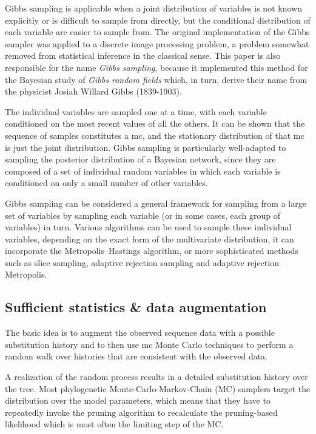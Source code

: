 Gibbs sampling is applicable when a joint distribution of variables is not known explicitly or is difficult to sample from directly, but the conditional distribution of each variable are easier to sample from.
The original implementation of the Gibbs sampler was applied to a discrete image processing problem, a problem somewhat removed from statistical inference in the classical sense.
This paper is also responsible for the name {\it Gibbs sampling}, because it implemented this method for the Bayesian study of {\it Gibbs random fields} which, in turn, derive their name from the physicist Josiah Willard Gibbs (1839-1903).

The individual variables are sampled one at a time, with each variable conditioned on the most recent values of all the others.
It can be shown that the sequence of samples constitutes a \gls{mc}, and the stationary distribution of that \gls{mc} is just the joint distribution.
Gibbs sampling is particularly well-adapted to sampling the \gls{posterior} distribution of a Bayesian network, since they are composed of a set of individual random variables in which each variable is conditioned on only a small number of other variables.

Gibbs sampling can be considered a general framework for sampling from a large set of variables by sampling each variable (or in some cases, each group of variables) in turn.
Various algorithms can be used to sample these individual variables, depending on the exact form of the multivariate distribution, it can incorporate the Metropolis–Hastings algorithm, or more sophisticated methods such as slice sampling, adaptive rejection sampling and adaptive rejection Metropolis.

\subsection{Sufficient statistics \& data augmentation}

The basic idea is to augment the observed sequence data with a possible \gls{substitution} history and to then use \gls{mc} Monte Carlo techniques to perform a random walk over histories that are consistent with the observed data.

A realization of the random process results in a detailed \gls{substitution} history over the tree.
Most phylogenetic Monte-Carlo-Markov-Chain (\acrshort{MC}) samplers target the distribution over the model parameters, which means that they have to repeatedly invoke the pruning algorithm to recalculate
the pruning-based \gls{likelihood} which is most often the limiting step of the \acrshort{MC}.

